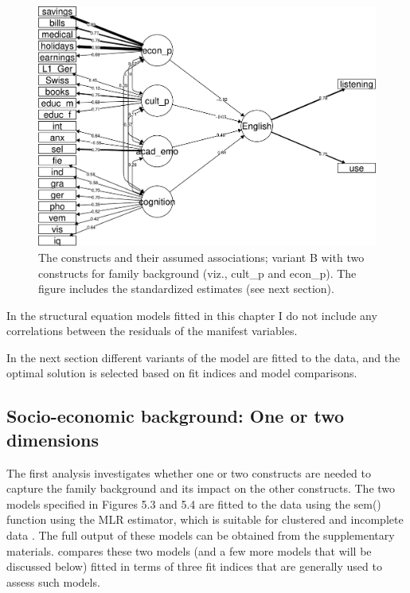 \documentclass[output=paper]{langsci/langscibook}
\begin{document}
\begin{figure}
\includegraphics[width=\textwidth]{figures/Figure5.4.pdf}
\caption{The constructs and their assumed associations; variant B with two constructs for family background (viz., cult\_p and econ\_p). The figure includes the standardized estimates (see next section).\label{fig:05:4}}
\end{figure}

In the structural equation models fitted in this chapter I do not include any correlations between the residuals of the manifest variables.

In the next section different variants of the model are fitted to the data, and the optimal solution is selected based on fit indices and model comparisons.

\subsection{Socio-economic background: One or two dimensions}

The first analysis investigates whether one or two constructs are needed to capture the family background and its impact on the other constructs. The two models specified in Figures 5.3 and 5.4 are fitted to the data using the sem() function using the MLR estimator, which is suitable for clustered and incomplete data \citep{Rosseel2012}. The full output of these models can be obtained from the supplementary materials.  compares these two models (and a few more models that will be discussed below) fitted in terms of three fit indices that are generally used to assess such models.
\end{document}
